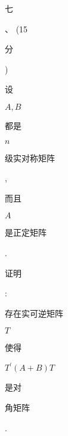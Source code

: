 \documentclass[10pt]{article}
\begin{document}
\begin{CJK}{UTF8}{mj}七\end{CJK}、 (15 \begin{CJK}{UTF8}{mj}分\end{CJK}) \begin{CJK}{UTF8}{mj}设\end{CJK} $A, B$ \begin{CJK}{UTF8}{mj}都是\end{CJK} $n$ \begin{CJK}{UTF8}{mj}级实对称矩阵\end{CJK}, \begin{CJK}{UTF8}{mj}而且\end{CJK} $A$ \begin{CJK}{UTF8}{mj}是正定矩阵\end{CJK}. \begin{CJK}{UTF8}{mj}证明\end{CJK}: \begin{CJK}{UTF8}{mj}存在实可逆矩阵\end{CJK} $T$ \begin{CJK}{UTF8}{mj}使得\end{CJK} $T^{\prime}(A+B) T$ \begin{CJK}{UTF8}{mj}是对\end{CJK} \begin{CJK}{UTF8}{mj}角矩阵\end{CJK}.
\end{document}
